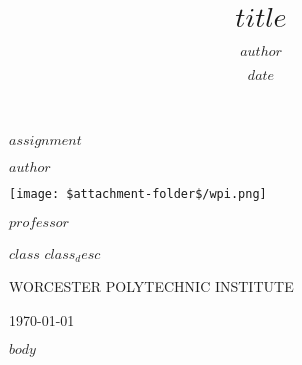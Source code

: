 \documentclass[12pt]{article}
\title{$title$}
\author{$author$}
\date{$date$}
\begin{document}
\pagestyle{fancy}
\fancyhf{}
\renewcommand{\headrulewidth}{0pt}
\fancyfoot[C]{\thepage}
\fancyfoot[R]{\monthyeardate\today}

\begin{titlepage}
    \centering
    \vspace*{2.5cm}
    
    {\Huge\bfseries $assignment$\par}
    \vspace{0.5cm}
    {\large $author$\par}
    \vspace{2.5cm}
    
    \texttt{[image: \$attachment-folder\$/wpi.png]}
    \vspace{2cm}
    
    {\large $professor$\par}
    \vspace{0.5cm}
    {\large $class$ $class_desc$\par}
    \vspace{0.5cm}
    {\large WORCESTER POLYTECHNIC INSTITUTE\par}
    \vspace{0.5cm}
    {\large\monthyeardate\today\par}
\end{titlepage}

$body$
\end{document}
